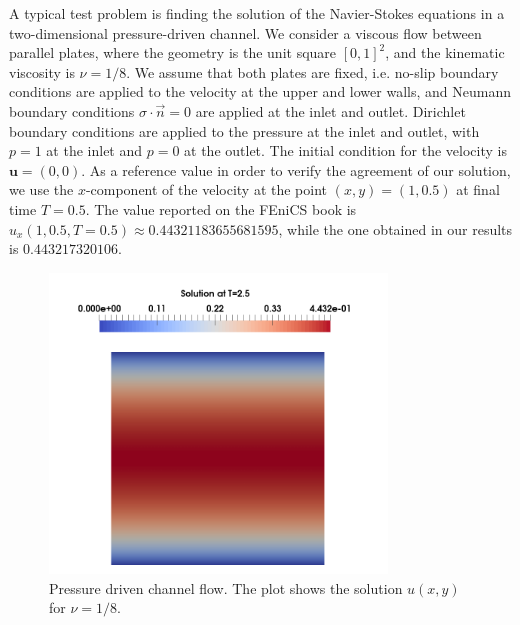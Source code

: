 \documentclass[a4paper,11pt,openright,twoside]{book}
\begin{document}

A typical test problem is finding the solution of the Navier-Stokes equations in a two-dimensional pressure-driven channel. We consider a viscous flow between parallel plates, where the geometry is the unit square $[0,1]^2$, and the kinematic viscosity is $\nu = 1/8$. We assume that both plates are fixed, i.e. no-slip boundary conditions are applied to the velocity at the upper and lower walls, and Neumann boundary conditions $\sigma \cdot \vec{n} = 0$ are applied at the inlet and outlet. Dirichlet boundary conditions are applied to the pressure at the inlet and outlet, with $p = 1$ at the inlet and $p = 0$ at the outlet. The initial condition for the velocity is $\mathbf{u} = (0,0)$. As a reference value in order to verify the agreement of our solution, we use the $x$-component of the velocity at the point $(x, y) = (1, 0.5)$ at final time $T = 0.5 $. The value reported on the FEniCS book \cite{logg} is $u_x(1, 0.5, T=0.5) \approx 0.44321183655681595$, while the one obtained in our results is $0.443217320106$.

\begin{figure}[h!]
\centering
\includegraphics[width=0.8\textwidth]{images/velocity_solution.png}
\caption{Pressure driven channel flow. The plot shows the solution $u(x,y)$ for $\nu = 1/8$.}
\end{figure}
\end{document}
